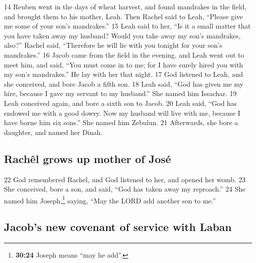 {14} Reuben went in the days of wheat harvest, and found mandrakes in
the field, and brought them to his mother, Leah. Then Rachel said to
Leah, ``Please give me some of your son's mandrakes.'' {15} Leah said to
her, ``Is it a small matter that you have taken away my husband? Would
you take away my son's mandrakes, also?'' Rachel said, ``Therefore he
will lie with you tonight for your son's mandrakes.'' {16} Jacob came
from the field in the evening, and Leah went out to meet him, and said,
``You must come in to me; for I have surely hired you with my son's
mandrakes.'' He lay with her that night. {17} God listened to Leah, and
she conceived, and bore Jacob a fifth son. {18} Leah said, ``God has
given me my hire, because I gave my servant to my husband.'' She named
him Issachar. {19} Leah conceived again, and bore a sixth son to Jacob.
{20} Leah said, ``God has endowed me with a good dowry. Now my husband
will live with me, because I have borne him six sons.'' She named him
Zebulun. {21} Afterwards, she bore a daughter, and named her Dinah.

\hypertarget{rachuxeal-grows-up-mother-of-josuxe9}{%
\subsection{Rachêl grows up mother of
José}\label{rachuxeal-grows-up-mother-of-josuxe9}}

{22} God remembered Rachel, and God listened to her, and opened her
womb. {23} She conceived, bore a son, and said, ``God has taken away my
reproach.'' {24} She named him Joseph,\footnote{\textbf{30:24} Joseph
  means ``may he add''.} saying, ``May the LORD add another son to me.''

\hypertarget{jacobs-new-covenant-of-service-with-laban}{%
\subsection{Jacob's new covenant of service with
Laban}\label{jacobs-new-covenant-of-service-with-laban}}

